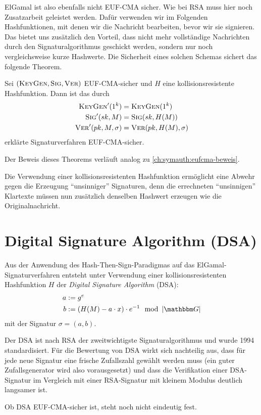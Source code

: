 ElGamal ist also ebenfalls nicht EUF-CMA sicher. Wie bei RSA muss hier noch Zusatzarbeit geleistet werden. Dafür verwenden wir im
Folgenden Hashfunktionen, mit denen wir die Nachricht bearbeiten, bevor wir sie signieren. Das bietet uns zusätzlich den Vorteil, dass
nicht mehr vollständige Nachrichten durch den Signaturalgorithmus geschickt werden, sondern nur noch vergleichsweise kurze Hashwerte. Die Sicherheit eines solchen Schemas sichert das folgende Theorem.~\\

\begin{theorem}
Sei $(\textsc{KeyGen}, \textsc{Sig}, \textsc{Ver})$ EUF-CMA-sicher und $H$ eine kollisionsresistente Hashfunktion. Dann ist das durch 
\begin{align*}
\textsc{KeyGen}'(1^k) &= \textsc{KeyGen}(1^k)\\
\textsc{Sig}'(sk,M) &= \textsc{Sig}(sk,H(M))\\
\textsc{Ver}'(pk,M,\sigma) &= \textsc{Ver}(pk,H(M),\sigma)
\end{align*}
erklärte Signaturverfahren EUF-CMA-sicher.~\\
\end{theorem}

Der Beweis dieses Theorems verläuft analog zu \ref{ch:symauth:eufcma-beweis}.

Die Verwendung einer kollisionsresistenten Hashfunktion ermöglicht eine Abwehr gegen die Erzeugung "`unsinniger"' Signaturen, denn die errechneten
"`unsinnigen"' Klartexte müssen nun zusätzlich denselben Hashwert erzeugen wie die Originalnachricht.


\section{Digital Signature Algorithm (DSA)}
Aus der Anwendung des Hash-Then-Sign-Paradigmas auf das ElGamal-Signaturverfahren entsteht unter Verwendung einer kollisionsresistenten
Hashfunktion $H$ der \emph{Digital Signature Algorithm} (DSA):
\begin{align*}
a &:= g^e\\
b &:= (H(M) - a \cdot x) \cdot e^{-1} \mod \left|\G\right|
\end{align*}
mit der Signatur $\sigma = (a,b)$.

Der DSA ist nach RSA der zweitwichtigste Signaturalgorithmus und wurde 1994 standardisiert. Für die Bewertung von DSA wirkt sich
nachteilig aus, dass für jede neue Signatur eine frische Zufallszahl gewählt werden muss (ein guter Zufallsgenerator wird also
vorausgesetzt) und dass die Verifikation einer DSA-Signatur im Vergleich mit einer RSA-Signatur mit kleinem Modulus deutlich langsamer ist.

Ob DSA EUF-CMA-sicher ist, steht noch nicht eindeutig fest.
